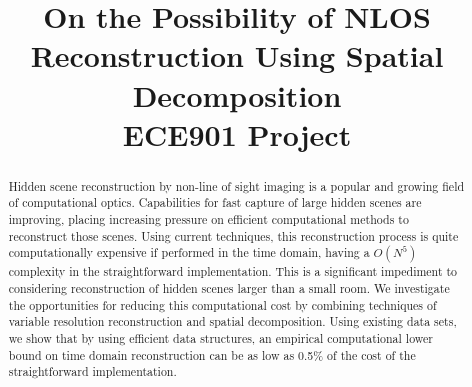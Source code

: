 \documentclass[conference]{IEEEtran}
\begin{document}
\title{On the Possibility of NLOS Reconstruction Using Spatial Decomposition\\ \Large{ECE901 Project}}


\author{
}


\maketitle



\begin{abstract}
Hidden scene reconstruction by non-line of sight imaging is a popular and growing field of computational optics. Capabilities for fast capture of large hidden scenes are improving, placing increasing pressure on efficient computational methods to reconstruct those scenes. Using current techniques, this reconstruction process is quite computationally expensive if performed in the time domain, having a $O(N^5)$ complexity in the straightforward implementation. This is a significant impediment to considering reconstruction of hidden scenes larger than a small room. We investigate the opportunities for reducing this computational cost by combining techniques of variable resolution reconstruction and spatial decomposition. Using existing data sets, we show that by using efficient data structures, an empirical computational lower bound on time domain reconstruction can be as low as 0.5\% of the cost of the straightforward implementation.
\end{abstract}
\end{document}
